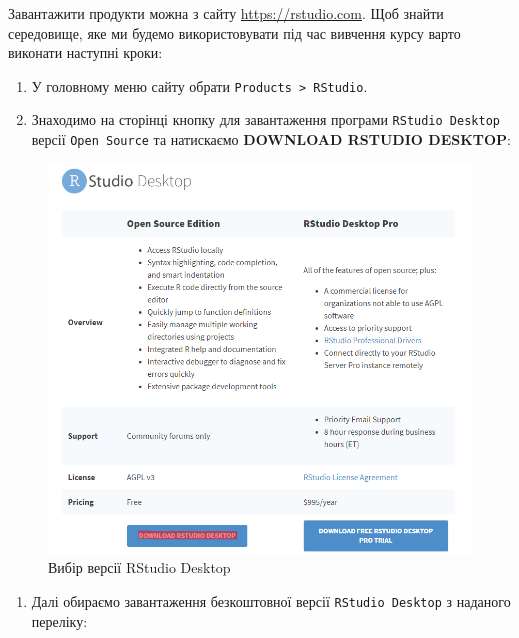\documentclass[
]{book}
\providecommand{\tightlist}{%
  \setlength{\itemsep}{0pt}\setlength{\parskip}{0pt}}
\begin{document}
Завантажити продукти можна з сайту \url{https://rstudio.com}. Щоб знайти середовище, яке ми будемо використовувати під час вивчення курсу варто виконати наступні кроки:

\begin{enumerate}
\def\labelenumi{\arabic{enumi}.}
\tightlist
\item
  У головному меню сайту обрати \texttt{Products\ \textgreater{}\ RStudio}.
\item
  Знаходимо на сторінці кнопку для завантаження програми \texttt{RStudio\ Desktop} версії \texttt{Open\ Source} та натискаємо \textbf{DOWNLOAD RSTUDIO DESKTOP}:
\end{enumerate}

\begin{figure}
\centering
\includegraphics{images/chapter1/rstudio_1.png}
\caption{\label{fig:unnamed-chunk-13}Вибір версії RStudio Desktop}
\end{figure}

\begin{enumerate}
\def\labelenumi{\arabic{enumi}.}
\setcounter{enumi}{2}
\tightlist
\item
  Далі обираємо завантаження безкоштовної версії \texttt{RStudio\ Desktop} з наданого переліку:
\end{enumerate}
\end{document}
